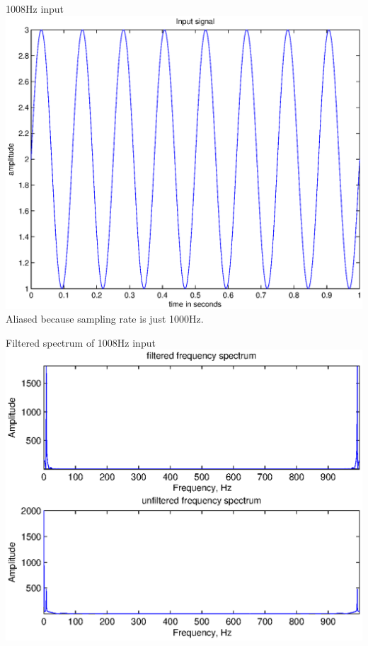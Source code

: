 \documentclass[mathserif]{beamer}
\begin{document}
    
    \begin{frame}{1008Hz input}
      \includegraphics[width=\linewidth]{inputSig1008Hz} \\
      \tiny{Aliased because sampling rate is just 1000Hz.}
    \end{frame}

    
    \begin{frame}{Filtered spectrum of 1008Hz input}
      \includegraphics[width=\linewidth]{freqSpec1008Hz}
    \end{frame}
\end{document}
